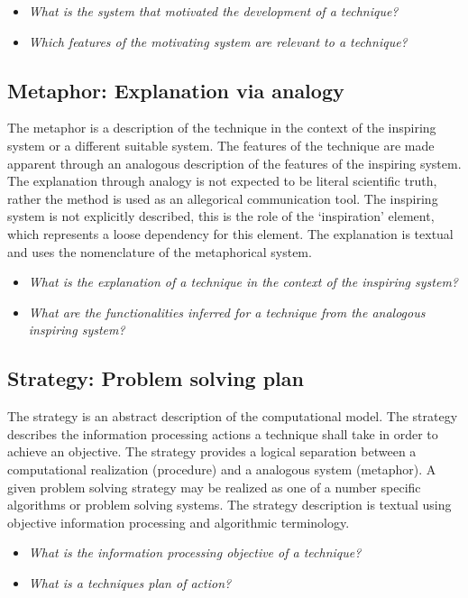 \documentclass[a4paper, 11pt]{article}
\begin{document}
\begin{itemize}
	\item \emph{What is the system that motivated the development of a technique?}
	\item \emph{Which features of the motivating system are relevant to a technique?}
\end{itemize}

\subsection{Metaphor: Explanation via analogy}
The metaphor is a description of the technique in the context of the inspiring system or a different suitable system. The features of the technique are made apparent through an analogous description of the features of the inspiring system. The explanation through analogy is not expected to be literal scientific truth, rather the method is used as an allegorical communication tool. The inspiring system is not explicitly described, this is the role of the `inspiration' element, which represents a loose dependency for this element. The explanation is textual and uses the nomenclature of the metaphorical system. 

\begin{itemize}
	\item \emph{What is the explanation of a technique in the context of the inspiring system?}
	\item \emph{What are the functionalities inferred for a technique from the analogous inspiring system?}
\end{itemize}

\subsection{Strategy: Problem solving plan}
The strategy is an abstract description of the computational model. The strategy describes the information processing actions a technique shall take in order to achieve an objective. The strategy provides a logical separation between a computational realization (procedure) and a analogous system (metaphor). A given problem solving strategy may be realized as one of a number specific algorithms or problem solving systems. The strategy description is textual using objective information processing and algorithmic terminology.

\begin{itemize}
	\item \emph{What is the information processing objective of a technique?}
	\item \emph{What is a techniques plan of action?}
\end{itemize}
\end{document}
